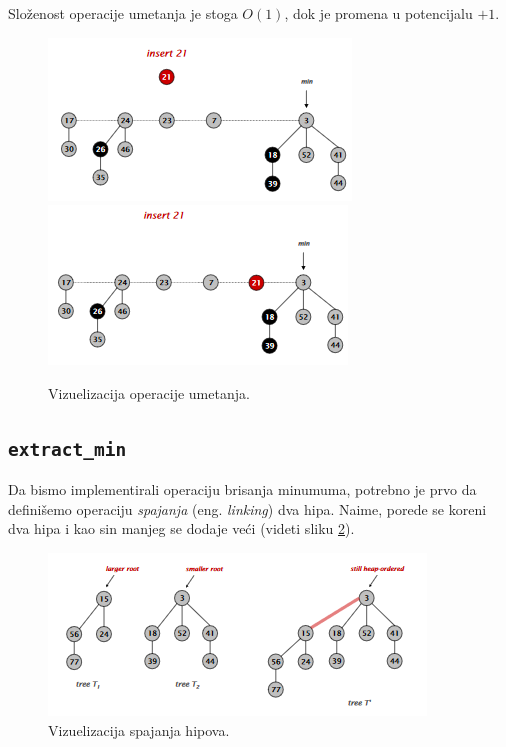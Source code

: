 \documentclass[a4paper]{article}
\theoremstyle{plain}
\theoremstyle{definition}
\begin{document}
Slo\v{z}enost operacije umetanja je stoga $O(1)$, dok je promena u potencijalu $+1$.

\begin{figure}[H]
    \centering
    \includegraphics[scale=0.85]{resources/fig2a.PNG}\\
    \includegraphics[scale=0.85]{resources/fig2b.PNG}
    \caption{Vizuelizacija operacije umetanja.}
    \label{fig2}
\end{figure}


\subsection{\texttt{extract\_min}}
\label{subsec:extractmin}

Da bismo implementirali operaciju brisanja minumuma, potrebno je prvo da defini\v{s}emo operaciju \emph{spajanja} (eng. \emph{linking}) dva hipa. Naime, porede se koreni dva hipa i kao sin manjeg se dodaje ve\'c{}i (videti sliku \ref{fig3}).

\begin{figure}[H]
    \centering
    \includegraphics[scale=0.85]{resources/fig3.PNG}
    \caption{Vizuelizacija spajanja hipova.}
    \label{fig3}
\end{figure}
\end{document}
